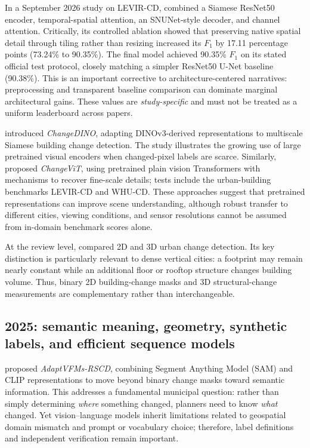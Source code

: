 \documentclass[11pt,a4paper]{article}
\begin{document}
In a September 2026 study on LEVIR-CD, \citet{Tiwari2026} combined a Siamese ResNet50 encoder, temporal-spatial attention, an SNUNet-style decoder, and channel attention. Critically, its controlled ablation showed that preserving native spatial detail through tiling rather than resizing increased its $F_1$ by 17.11 percentage points (73.24\% to 90.35\%). The final model achieved 90.35\% $F_1$ on its stated official test protocol, closely matching a simpler ResNet50 U-Net baseline (90.38\%). This is an important corrective to architecture-centered narratives: preprocessing and transparent baseline comparison can dominate marginal architectural gains. These values are \emph{study-specific} and must not be treated as a uniform leaderboard across papers.

\citet{ChengHsu2026} introduced \emph{ChangeDINO}, adapting DINOv3-derived representations to multiscale Siamese building change detection. The study illustrates the growing use of large pretrained visual encoders when changed-pixel labels are scarce. Similarly, \citet{Zhu2026} proposed \emph{ChangeViT}, using pretrained plain vision Transformers with mechanisms to recover fine-scale details; tests include the urban-building benchmarks LEVIR-CD and WHU-CD. These approaches suggest that pretrained representations can improve scene understanding, although robust transfer to different cities, viewing conditions, and sensor resolutions cannot be assumed from in-domain benchmark scores alone.

At the review level, \citet{Gomroki2026} compared 2D and 3D urban change detection. Its key distinction is particularly relevant to dense vertical cities: a footprint may remain nearly constant while an additional floor or rooftop structure changes building volume. Thus, binary 2D building-change masks and 3D structural-change measurements are complementary rather than interchangeable.

\subsection{2025: semantic meaning, geometry, synthetic labels, and efficient sequence models}

\citet{Jiang2025} proposed \emph{AdaptVFMs-RSCD}, combining Segment Anything Model (SAM) and CLIP representations to move beyond binary change masks toward semantic information. This addresses a fundamental municipal question: rather than simply determining \emph{where} something changed, planners need to know \emph{what} changed. Yet vision--language models inherit limitations related to geospatial domain mismatch and prompt or vocabulary choice; therefore, label definitions and independent verification remain important.
\end{document}
